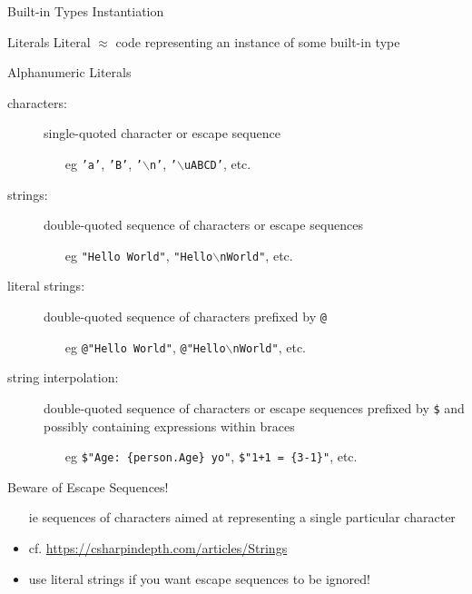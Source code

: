 \documentclass[presentation]{beamer}
\newcommand{\literal}[1]{\texttt{\alert{#1}}}
\newcommand{\bs}{$\backslash$}
\begin{document}
\begin{frame}[allowframebreaks]{Built-in Types Instantiation}
    \begin{block}{Literals}\centering
        Literal $\approx$ \dotnet code representing an instance of some built-in type
    \end{block}

    \begin{exampleblock}{Alphanumeric Literals}
        \begin{description}
            \item[characters:] single-quoted character or escape sequence
            \begin{itemize}
                \item[eg] \literal{'a'}, \literal{'B'}, \literal{'\bs{}n'}, \literal{'\bs{}uABCD'}, etc.
            \end{itemize} 
             
            \item[strings:] double-quoted sequence of characters or escape sequences
            \begin{itemize}
                \item[eg] \literal{"Hello World"}, \literal{"Hello\bs{}nWorld"}, etc.
            \end{itemize} 

            \item[literal strings:] double-quoted sequence of characters prefixed by \literal{@}
            \begin{itemize}
                \item[eg] \literal{@"Hello World"}, \literal{@"Hello\bs{}nWorld"}, etc.
            \end{itemize} 
            
            \item[string interpolation:] double-quoted sequence of characters or escape sequences prefixed by \literal{\$} and possibly containing expressions within braces
            \begin{itemize}
                \item[eg] \literal{\$"Age: \{person.Age\} yo"}, \literal{\$"1+1 = \{3-1\}"}, etc.
            \end{itemize}  
        \end{description}
    \end{exampleblock}

    \begin{alertblock}{Beware of Escape Sequences!}
        \begin{itemize}
            \item[ie] sequences of characters aimed at representing a single particular character
            \item cf. \url{https://csharpindepth.com/articles/Strings} 
            \item use literal strings if you want escape sequences to be ignored!
        \end{itemize}
    \end{alertblock}


\end{frame}
\end{document}
